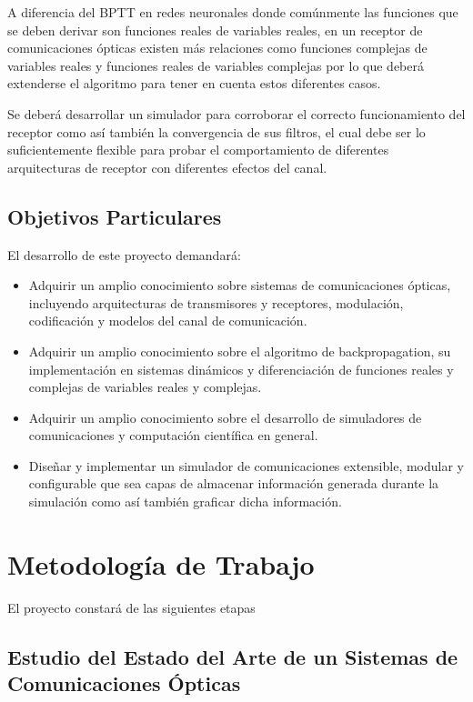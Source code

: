 \documentclass[12pt, twoside]{unc_so2_template}
\begin{document}
A diferencia del BPTT en redes neuronales donde comúnmente las funciones que se
deben derivar son funciones reales de variables reales, en un receptor de
comunicaciones ópticas existen más relaciones como funciones complejas de
variables reales y funciones reales de variables complejas por lo que deberá
extenderse el algoritmo para tener en cuenta estos diferentes casos.

Se deberá desarrollar un simulador para corroborar el correcto funcionamiento del
receptor como así también la convergencia de sus filtros, el cual debe ser lo
suficientemente flexible para probar el comportamiento de diferentes
arquitecturas de receptor con diferentes efectos del canal.

\section{Objetivos Particulares}

El desarrollo de este proyecto demandará:

\begin{itemize}
\item Adquirir un amplio conocimiento sobre sistemas de comunicaciones ópticas,
  incluyendo arquitecturas de transmisores y receptores, modulación,
  codificación y modelos del canal de comunicación.

\item Adquirir un amplio conocimiento sobre el algoritmo de backpropagation, su
  implementación en sistemas dinámicos y diferenciación de funciones reales y
  complejas de variables reales y complejas.

\item Adquirir un amplio conocimiento sobre el desarrollo de simuladores de
  comunicaciones y computación científica en general.

\item Diseñar y implementar un simulador de comunicaciones extensible, modular y
  configurable que sea capas de almacenar información generada durante
  la simulación como así también graficar dicha información.
\end{itemize}

\chapter{Metodología de Trabajo}
El proyecto constará de las siguientes etapas
\section{Estudio del Estado del Arte de un Sistemas de Comunicaciones Ópticas}
\end{document}
